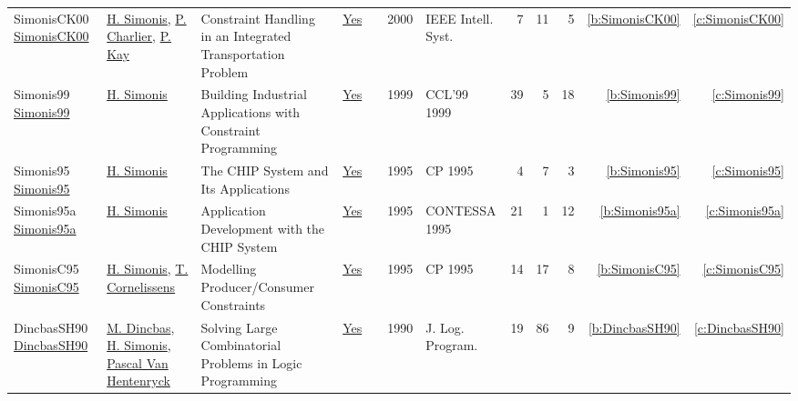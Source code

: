 {\begin{longtable}{>{\raggedright\arraybackslash}p{3cm}>{\raggedright\arraybackslash}p{6cm}>{\raggedright\arraybackslash}p{6.5cm}rrrp{2.5cm}rrrrr}
SimonisCK00 \href{https://doi.org/10.1109/5254.820326}{SimonisCK00} & \hyperref[auth:a17]{H. Simonis}, \hyperref[auth:a901]{P. Charlier}, \hyperref[auth:a902]{P. Kay} & Constraint Handling in an Integrated Transportation Problem & \href{../works/SimonisCK00.pdf}{Yes} & \cite{SimonisCK00} & 2000 & {IEEE} Intell. Syst. & 7 & 11 & 5 & \ref{b:SimonisCK00} & \ref{c:SimonisCK00}\\
Simonis99 \href{https://doi.org/10.1007/3-540-45406-3\_6}{Simonis99} & \hyperref[auth:a17]{H. Simonis} & Building Industrial Applications with Constraint Programming & \href{../works/Simonis99.pdf}{Yes} & \cite{Simonis99} & 1999 & CCL'99 1999 & 39 & 5 & 18 & \ref{b:Simonis99} & \ref{c:Simonis99}\\
Simonis95 \href{https://doi.org/10.1007/3-540-60299-2\_42}{Simonis95} & \hyperref[auth:a17]{H. Simonis} & The {CHIP} System and Its Applications & \href{../works/Simonis95.pdf}{Yes} & \cite{Simonis95} & 1995 & CP 1995 & 4 & 7 & 3 & \ref{b:Simonis95} & \ref{c:Simonis95}\\
Simonis95a \href{https://doi.org/10.1007/3-540-60794-3\_11}{Simonis95a} & \hyperref[auth:a17]{H. Simonis} & Application Development with the {CHIP} System & \href{../works/Simonis95a.pdf}{Yes} & \cite{Simonis95a} & 1995 & CONTESSA 1995 & 21 & 1 & 12 & \ref{b:Simonis95a} & \ref{c:Simonis95a}\\
SimonisC95 \href{https://doi.org/10.1007/3-540-60299-2\_27}{SimonisC95} & \hyperref[auth:a17]{H. Simonis}, \hyperref[auth:a306]{T. Cornelissens} & Modelling Producer/Consumer Constraints & \href{../works/SimonisC95.pdf}{Yes} & \cite{SimonisC95} & 1995 & CP 1995 & 14 & 17 & 8 & \ref{b:SimonisC95} & \ref{c:SimonisC95}\\
DincbasSH90 \href{https://doi.org/10.1016/0743-1066(90)90052-7}{DincbasSH90} & \hyperref[auth:a726]{M. Dincbas}, \hyperref[auth:a17]{H. Simonis}, \hyperref[auth:a149]{Pascal Van Hentenryck} & Solving Large Combinatorial Problems in Logic Programming & \href{../works/DincbasSH90.pdf}{Yes} & \cite{DincbasSH90} & 1990 & J. Log. Program. & 19 & 86 & 9 & \ref{b:DincbasSH90} & \ref{c:DincbasSH90}\\
\end{longtable}
}

\clearpage
